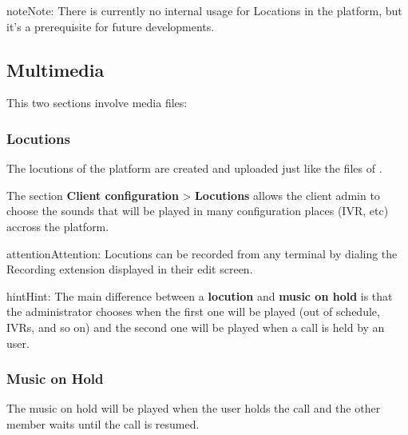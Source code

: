 \documentclass[letterpaper,10pt,english]{sphinxmanual}
\begin{document}
\begin{notice}{note}{Note:}
There is currently no internal usage for Locations in the
platform, but it's a prerequisite for future developments.
\end{notice}


\subsection{Multimedia}
\label{administration_portal/client/vpbx/multimedia/index:multimedia}\label{administration_portal/client/vpbx/multimedia/index::doc}
This two sections involve media files:


\subsubsection{Locutions}
\label{administration_portal/client/vpbx/multimedia/locutions:locutions}\label{administration_portal/client/vpbx/multimedia/locutions::doc}
The locutions of the platform are created and uploaded just like the files of
{\hyperref[administration_portal/client/vpbx/multimedia/music_on_hold:musiconhold]{}}.

The section \textbf{Client configuration} \textgreater{} \textbf{Locutions}  allows the client admin
to choose the sounds that will be played in many configuration places (IVR, etc)
accross the platform.

\begin{notice}{attention}{Attention:}
Locutions can be recorded from any terminal by dialing the
Recording extension displayed in their edit screen.
\end{notice}

\begin{notice}{hint}{Hint:}
The main difference between a \textbf{locution} and \textbf{music on hold} is
that the administrator chooses when the first one will be played (out of
schedule, IVRs, and so on) and the second one will be played when a call is
held by an user.
\end{notice}
\label{administration_portal/client/vpbx/multimedia/music_on_hold:musiconhold}

\subsubsection{Music on Hold}
\label{administration_portal/client/vpbx/multimedia/music_on_hold:music-on-hold}\label{administration_portal/client/vpbx/multimedia/music_on_hold::doc}\label{administration_portal/client/vpbx/multimedia/music_on_hold:musiconhold}\label{administration_portal/client/vpbx/multimedia/music_on_hold:id1}
The music on hold will be played when the user holds the call and the other
member waits until the call is resumed.
\end{document}
